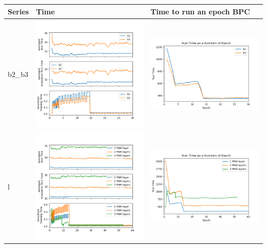 \begin{longtable}[]{@{}lll@{}}
\hline
Series & Time & Time to run an epoch
BPC\tabularnewline
\hline
\endhead
b2\_b3 & \includegraphics[width=.45\textwidth]{parts/appendix/reports-gmsnn/docs_esteban-latex/test_reports/2018-06-27/b2_b3_time.png} &
\includegraphics[width=.45\textwidth]{parts/appendix/reports-gmsnn/docs_esteban-latex/test_reports/2018-06-27/b2_b3_epoch.png} \tabularnewline

l & \includegraphics[width=.45\textwidth]{parts/appendix/reports-gmsnn/docs_esteban-latex/test_reports/2018-06-27/l_time.png} &
 \includegraphics[width=.45\textwidth]{parts/appendix/reports-gmsnn/docs_esteban-latex/test_reports/2018-06-27/l_epoch.png} \tabularnewline


\end{longtable}
